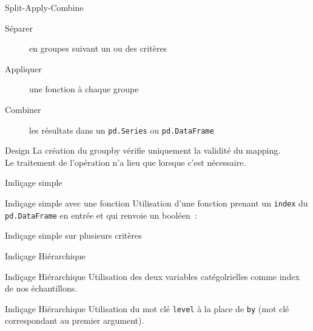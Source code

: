 \begin{frame}{Split-Apply-Combine}
  \begin{description}
    \item[Séparer]   en groupes suivant un ou des critères
    \item[Appliquer] une fonction à chaque groupe
    \item[Combiner]  les résultats dans un \texttt{pd.Series} ou \texttt{pd.DataFrame}
  \end{description}
\end{frame}

\begin{frame}{Design}
  La création du groupby vérifie uniquement la validité du mapping. \\
  Le traitement de l'opération n'a lieu que lorsque c'est nécessaire. \\
\end{frame}

\begin{frame}{Indiçage simple}
\end{frame}

\begin{frame}{Indiçage simple avec une fonction}
  Utilisation d'une fonction prenant un \texttt{index} du \texttt{pd.DataFrame} en entrée et qui renvoie un booléen~:
\end{frame}

\begin{frame}{Indiçage simple sur plusieurs critères}
\end{frame}

\begin{frame}{Indiçage Hiérarchique}
\end{frame}

\begin{frame}{Indiçage Hiérarchique}
  Utilisation des deux variables catégolrielles comme index de nos échantillons.\\
\end{frame}

\begin{frame}{Indiçage Hiérarchique}
  Utilisation du mot clé \texttt{level} à la place de \texttt{by} (mot clé correspondant au premier argument).\\
\end{frame}

